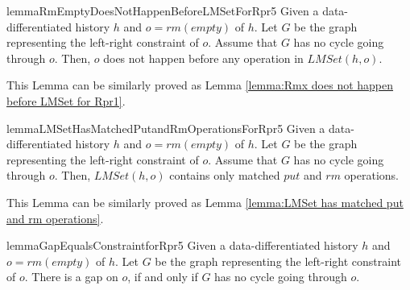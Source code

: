 \documentclass{llncs}
\begin{document}
\begin{restatable}{lemma}{RmEmptyDoesNotHappenBeforeLMSetForRpr5}
\label{lemma:RmEmpty does not happen before LMSet for Rpr5}
Given a data-differentiated history $h$ and $o = \textit{rm}(\textit{empty})$ of $h$. Let $G$ be the graph representing the left-right constraint of $o$. Assume that $G$ has no cycle going through $o$. Then, $o$ does not happen before any operation in $\textit{LMSet}(h,o)$.
\end{restatable}

This Lemma can be similarly proved as Lemma \ref{lemma:Rmx does not happen before LMSet for Rpr1}.


\begin{restatable}{lemma}{LMSetHasMatchedPutandRmOperationsForRpr5}
\label{lemma:LMSet has matched put and rm operations for Rpr5}
Given a data-differentiated history $h$ and $o = \textit{rm}(\textit{empty})$ of $h$. Let $G$ be the graph representing the left-right constraint of $o$. Assume that $G$ has no cycle going through $o$. Then, $\textit{LMSet}(h,o)$ contains only matched $\textit{put}$ and $\textit{rm}$ operations.
\end{restatable}

This Lemma can be similarly proved as Lemma \ref{lemma:LMSet has matched put and rm operations}.


\begin{restatable}{lemma}{GapEqualsConstraintforRpr5}
\label{lemma:Gap Equals Constraint for Rpr5}
Given a data-differentiated history $h$ and $o = \textit{rm}(\textit{empty})$ of $h$. Let $G$ be the graph representing the left-right constraint of $o$. There is a gap on $o$, if and only if $G$ has no cycle going through $o$.
\end{restatable}
\end{document}
